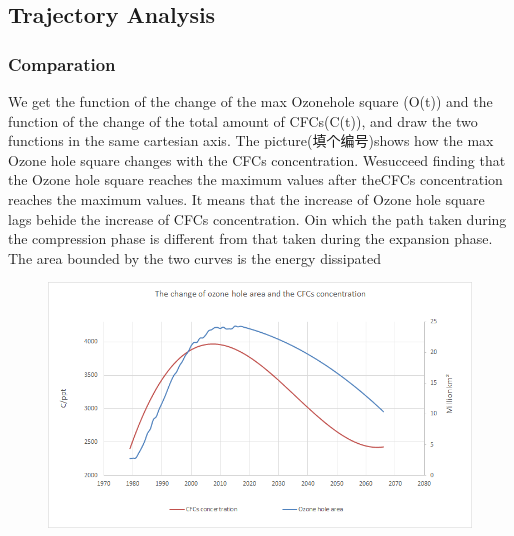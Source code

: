 \documentclass[12pt]{article}
\begin{document}
\subsection{Trajectory Analysis}
\subsubsection{Comparation}
We get the function of the change of the max Ozonehole square (O(t)) and the function of the change of the total amount of CFCs(C(t)), and draw the two functions in the same cartesian axis. The picture(填个编号)shows how the max Ozone hole square changes with the CFCs concentration. Wesucceed finding that the Ozone hole square reaches the maximum values after theCFCs concentration reaches the maximum values. It means that the increase of Ozone hole square lags behide the increase of CFCs concentration.
Oin which the path taken during the compression phase
is different from that taken during the expansion phase. The area bounded by the two curves is the energy dissipated
\begin{center}
\begin{figure}[htpb]
\centering
\includegraphics[scale=0.6]{ha}
\caption{}\label{fig:twoline}
\end{figure}
\end{center}
\end{document}
